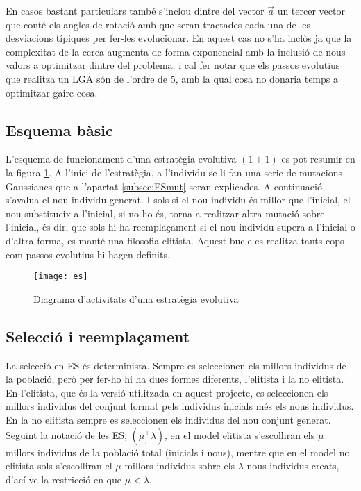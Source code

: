 \documentclass[titlepage,a4paper,12pt]{book}
\begin{document}
En casos bastant particulars també s'inclou dintre del vector $\vec{a}$ un
tercer vector que conté els angles de rotació amb que seran tractades cada una
de les desviacions típiques per fer-les evolucionar. En aquest cas no s'ha
inclòs ja que la complexitat de la cerca augmenta de forma exponencial amb la
inclusió de nous valors a optimitzar dintre del problema, i cal fer notar que
els passos evolutius que realitza un LGA són de l'ordre de 5, amb la qual cosa
no donaria temps a optimitzar gaire cosa.

\subsection{Esquema bàsic}

L'esquema de funcionament d'una estratègia evolutiva $(1+1)$ es pot resumir en
la figura \ref{fig:es}. A l'inici de l'estratègia, a l'individu se li fan una
serie de mutacions Gaussianes que a l'apartat \ref{subsec:ESmut} seran
explicades. A continuació s'avalua el nou individu generat. I sols si el nou
individu és millor que l'inicial, el nou substitueix a l'inicial, si no ho és,
torna a realitzar altra mutació sobre l'inicial, és dir, que sols hi ha
reemplaçament si el nou individu supera a l'inicial o d'altra forma, es manté
una filosofia elitista. Aquest bucle es realitza tants cops com passos evolutius
hi hagen definits.

\begin{figure} \centering \texttt{[image: es]}
\caption{\label{fig:es}Diagrama d'activitats d'una estratègia evolutiva}
\end{figure}

\subsection{Selecció i reemplaçament} La selecció en ES és determinista. Sempre
es seleccionen els millors individus de la població, però per fer-ho hi ha dues
formes diferents, l'elitista i la no elitista. En l'elitista, que és la versió
utilitzada en aquest projecte, es seleccionen els millors individus del conjunt
format pels individus inicials més els nous individus. En la no elitista sempre
es seleccionen els individus del nou conjunt generat.  Seguint la notació de les
ES, $(\mu _,^+ \lambda)$, en el model elitista s'escolliran els $\mu$ millors
individus de la població total (inicials i nous), mentre que en el model no
elitista sols s'escolliran el $\mu$ millors individus sobre els $\lambda$ nous
individus creats, d'ací ve la restricció en que $\mu < \lambda$.
\end{document}
